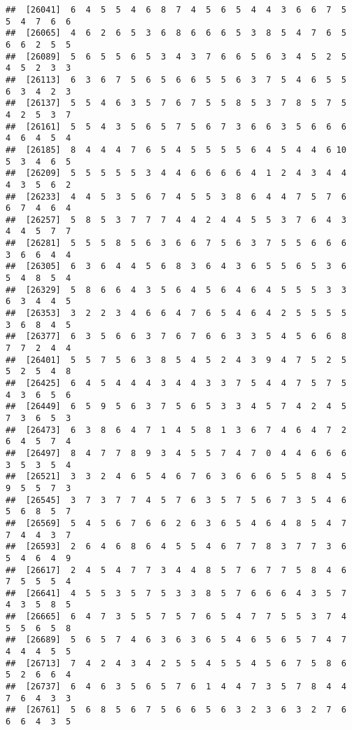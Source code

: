 \documentclass[
]{book}
\begin{document}
\begin{verbatim}
##  [26041]  6  4  5  5  4  6  8  7  4  5  6  5  4  4  3  6  6  7  5  5  4  7  6  6
##  [26065]  4  6  2  6  5  3  6  8  6  6  6  5  3  8  5  4  7  6  5  6  6  2  5  5
##  [26089]  5  6  5  5  6  5  3  4  3  7  6  6  5  6  3  4  5  2  5  4  5  2  3  3
##  [26113]  6  3  6  7  5  6  5  6  6  5  5  6  3  7  5  4  6  5  5  6  3  4  2  3
##  [26137]  5  5  4  6  3  5  7  6  7  5  5  8  5  3  7  8  5  7  5  4  2  5  3  7
##  [26161]  5  5  4  3  5  6  5  7  5  6  7  3  6  6  3  5  6  6  6  4  6  4  5  4
##  [26185]  8  4  4  4  7  6  5  4  5  5  5  5  6  4  5  4  4  6 10  5  3  4  6  5
##  [26209]  5  5  5  5  5  3  4  4  6  6  6  6  4  1  2  4  3  4  4  4  3  5  6  2
##  [26233]  4  4  5  3  5  6  7  4  5  5  3  8  6  4  4  7  5  7  6  6  7  4  6  4
##  [26257]  5  8  5  3  7  7  7  4  4  2  4  4  5  5  3  7  6  4  3  4  4  5  7  7
##  [26281]  5  5  5  8  5  6  3  6  6  7  5  6  3  7  5  5  6  6  6  3  6  6  4  4
##  [26305]  6  3  6  4  4  5  6  8  3  6  4  3  6  5  5  6  5  3  6  5  4  8  5  4
##  [26329]  5  8  6  6  4  3  5  6  4  5  6  4  6  4  5  5  5  3  3  6  3  4  4  5
##  [26353]  3  2  2  3  4  6  6  4  7  6  5  4  6  4  2  5  5  5  5  3  6  8  4  5
##  [26377]  6  3  5  6  6  3  7  6  7  6  6  3  3  5  4  5  6  6  8  7  7  2  4  4
##  [26401]  5  5  7  5  6  3  8  5  4  5  2  4  3  9  4  7  5  2  5  5  2  5  4  8
##  [26425]  6  4  5  4  4  4  3  4  4  3  3  7  5  4  4  7  5  7  5  4  3  6  5  6
##  [26449]  6  5  9  5  6  3  7  5  6  5  3  3  4  5  7  4  2  4  5  7  3  6  5  3
##  [26473]  6  3  8  6  4  7  1  4  5  8  1  3  6  7  4  6  4  7  2  6  4  5  7  4
##  [26497]  8  4  7  7  8  9  3  4  5  5  7  4  7  0  4  4  6  6  6  3  5  3  5  4
##  [26521]  3  3  2  4  6  5  4  6  7  6  3  6  6  6  5  5  8  4  5  9  5  5  7  3
##  [26545]  3  7  3  7  7  4  5  7  6  3  5  7  5  6  7  3  5  4  6  5  6  8  5  7
##  [26569]  5  4  5  6  7  6  6  2  6  3  6  5  4  6  4  8  5  4  7  7  4  4  3  7
##  [26593]  2  6  4  6  8  6  4  5  5  4  6  7  7  8  3  7  7  3  6  5  4  6  4  9
##  [26617]  2  4  5  4  7  7  3  4  4  8  5  7  6  7  7  5  8  4  6  7  5  5  5  4
##  [26641]  4  5  5  3  5  7  5  3  3  8  5  7  6  6  6  4  3  5  7  4  3  5  8  5
##  [26665]  6  4  7  3  5  5  7  5  7  6  5  4  7  7  5  5  3  7  4  5  5  6  5  8
##  [26689]  5  6  5  7  4  6  3  6  3  6  5  4  6  5  6  5  7  4  7  4  4  4  5  5
##  [26713]  7  4  2  4  3  4  2  5  5  4  5  5  4  5  6  7  5  8  6  5  2  6  6  4
##  [26737]  6  4  6  3  5  6  5  7  6  1  4  4  7  3  5  7  8  4  4  7  6  4  3  3
##  [26761]  5  6  8  5  6  7  5  6  6  5  6  3  2  3  6  3  2  7  6  6  6  4  3  5

\end{verbatim}
\end{document}
